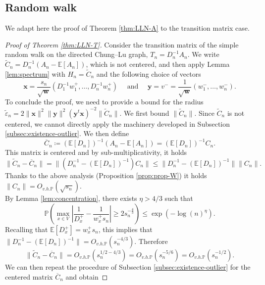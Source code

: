 \documentclass[11pt,oneside]{amsart}
\theoremstyle{plain}
\numberwithin{equation}{section}
\newcommand{\eps}{\varepsilon}
\newcommand{\E}{\mathbb{E}}
\newcommand{\p}{\mathbb{P}}
\newcommand{\centered}{C_n}
\newcommand{\overlinecentered}{{\overline C_n}}
\newcommand{\tildecentered}{{\widetilde C_n}}
\newcommand{\w}{\boldsymbol{w}}
\newcommand{\xx}{\boldsymbol{x}}
\newcommand{\yy}{\boldsymbol{y}}
\newcommand{\scaling}{s_n}
\newcommand{\Ohp}{O_{v.h.\p}}
\begin{document}
\subsection{Random walk}

\label{subsec:sp-transition-matrix}

We adapt here the proof of Theorem \ref{thm:LLN-A} to the transition matrix case.
\begin{proof}[Proof of Theorem \ref{thm:LLN-T}]
    
Consider the transition matrix of the simple random walk on the directed Chung--Lu graph, $T_n=D_n^{-1}A_n$. We write $\tildecentered=D_n^{-1}(A_n-\E[A_n])$, which is not centered, and then apply Lemma \ref{lem:spectrum} with $H_n=\tildecentered$ and the following choice of vectors
    \begin{equation} \label{eq:vectors}
    \xx=\frac{{\scaling}}{\sqrt{\w}} (D_1^{-1}w_1^+, \dots ,D_n^{-1}w_n^+ ) 
    \quad \text{ and } \quad 
    \yy=v^-=\frac{1}{\sqrt{\w}}(w_1^-, \dots, w_n^-). 
\end{equation}
To conclude the proof, we need to provide a bound for the radius $\tilde \eps_n = 2\|\xx\|^2\|\yy\|^2(\yy^t\xx)^{-2}\|\tildecentered \|.$
We first bound $\|\tildecentered \|$. Since $\tildecentered$ is not centered, we cannot directly apply the machinery developed in Subsection \ref{subsec:existence-outlier}. We then define $$\overlinecentered\coloneq (\E[D_n])^{-1}\left(A_n-  \E[A_n]\right)=(\E[D_n])^{-1}\centered.$$
This matrix is centered and by sub-multiplicativity, it holds
$$\|\tildecentered -\overlinecentered\|=\|(D_n^{-1}-(\E[D_n])^{-1})\centered\|\le \|D_n^{-1}-(\E[D_n])^{-1}\|\|\centered\|.$$
Thanks to the above analysis (Proposition \ref{prop:prop-W}) it holds $\|\centered\|=\Ohp(\sqrt{\scaling})$.\\
By Lemma \ref{lem:concentration}, there exists $\eta>4/3$ such that
\begin{equation}  \label{eq:concentration}
    \p\left(\max_{x \in V}\left|\frac{1}{D_x^+}-\frac1{w_x^+\scaling}\right|\ge 2\scaling^{-\frac43}\right)
    \le \exp(-\log(n)^{\eta}).
\end{equation}
Recalling that $\E[D_x^+]=w_x^+ \scaling$, this implies that $\|D_n^{-1}-(\E[D_n])^{-1}\|=\Ohp(\scaling^{-4/3})$.
Therefore
$$\|\tildecentered -\overlinecentered\|=\Ohp(\scaling^{{1}/{2}-{4}/{3}})=\Ohp(\scaling^{-5/6})=\Ohp(\scaling^{-1/2}).$$ 
We can then repeat the procedure of Subsection \ref{subsec:existence-outlier} for the centered matrix $\overlinecentered$ and obtain 

\end{proof}
\end{document}
